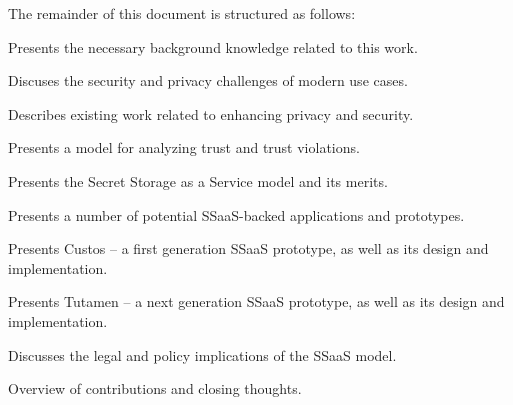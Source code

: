 The remainder of this document is structured as follows:

\begin{packed_desc}
\item[Chapter~\ref{chap:background} - Background:] Presents the
  necessary background knowledge related to this work.
\item[Chapter~\ref{chap:challenges} - Challenges:] Discuses the
  security and privacy challenges of modern use cases.
\item[Chapter~\ref{chap:related} - Related Work:] Describes existing
  work related to enhancing privacy and security.
\item[Chapter~\ref{chap:trust} - Trust Model:] Presents a model for
  analyzing trust and trust violations.
\item[Chapter~\ref{chap:ssaas} - SSaaS:] Presents the Secret Storage
  as a Service model and its merits.
\item[Chapter~\ref{chap:apps} - Applications:] Presents a number of
  potential SSaaS-backed applications and prototypes.
\item[Chapter~\ref{chap:custos} - Custos:] Presents Custos -- a first
  generation SSaaS prototype, as well as its design and implementation.
\item[Chapter~\ref{chap:tutamen} - Tutamen:] Presents Tutamen -- a
  next generation SSaaS prototype, as well as its design and
  implementation.
\item[Chapter~\ref{chap:policy} - Policy:] Discusses the legal and
  policy implications of the SSaaS model.
\item[Chapter~\ref{chap:conclusion} - Conclusion:] Overview of
  contributions and closing thoughts.
\end{packed_desc}

